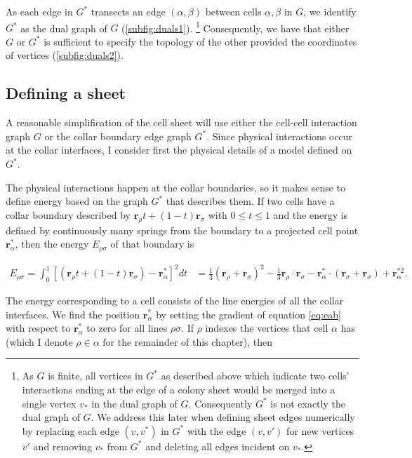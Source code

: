 As each edge in $G^*$ transects an edge $(\alpha, \beta)$ between cells $\alpha, \beta$ in $G$, we identify $G^*$ as the dual graph of $G$ (\cref{subfig:duals1}). \footnote{As $G$ is finite, all vertices in $G^*$ as described above which indicate two cells' interactions ending at the edge of a colony sheet would be merged into a single vertex $v_*$ in the dual graph of $G$. Consequently $G^*$ is not exactly the dual graph of $G$. We address this later when defining sheet edges numerically by replacing each edge $(v, v^*)$ in $G^*$ with the edge $(v, v')$ for new vertices $v'$ and removing $v_*$ from $G^*$ and deleting all edges incident on $v_*$.}
Consequently, we have that either $G$ or $G^*$ is sufficient to specify the topology of the other provided the coordinates of vertices (\cref{subfig:duals2}). 

\subsection{Defining a sheet}

A reasonable simplification of the cell sheet will use either the cell-cell interaction graph $G$ or the collar boundary edge graph $G^*$. 
Since physical interactions occur at the collar interfaces, I consider first the physical details of a model defined on $G^*$. 

The physical interactions happen at the collar boundaries, so it makes sense to define energy based on the graph $G^*$ that describes them. 
If two cells have a collar boundary described by $\bm{r}_\rho t + (1-t)\bm{r}_\sigma$ with $0 \leq t \leq 1$ and the energy is defined by continuously many springs from the boundary to a projected cell point $\bm{r}^*_\alpha$, then the energy $E_{\rho\sigma}$ of that boundary is 

\begin{align}
    E_{\rho\sigma} = \int_0^1 \left[(\bm{r}_\rho t + (1-t)\bm{r}_\sigma) - \bm{r}^*_\alpha \right]^2 dt &= \frac{1}{3} (\bm{r}_\rho + \bm{r}_\sigma)^2 - \frac{1}{3} \bm{r}_\rho\cdot\bm{r}_\sigma - \bm{r}^*_\alpha \cdot (\bm{r}_\sigma + \bm{r}_\sigma) + \bm{r}^{*2}_\alpha. \label{eq:eab}
\end{align}

The energy corresponding to a cell consists of the line energies of all the collar interfaces. 
We find the position $\bm{r}^*_\alpha$ by setting the gradient of equation \ref{eq:eab} with respect to $\bm{r}^*_\alpha$ to zero for all lines $\rho\sigma$. 
If $\rho$ indexes the vertices that cell $\alpha$ has (which I denote $\rho\in\alpha$ for the remainder of this chapter), then 

